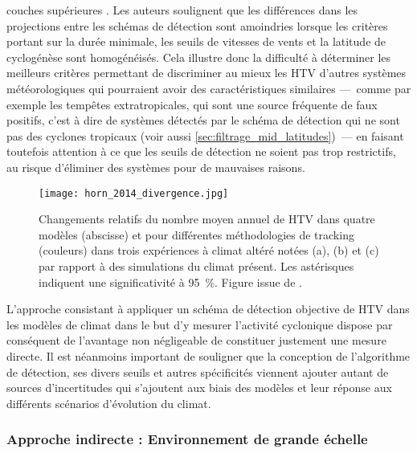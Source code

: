 \documentclass[../main.tex]{subfiles}
\begin{document}
couches supérieures \parencite{horn_tracking_2014}. Les auteurs soulignent que les différences dans les projections entre les schémas de détection sont
amoindries lorsque les critères portant sur la durée minimale, les seuils de vitesses de vents et la latitude de cyclogénèse sont homogénéisés. Cela illustre
donc la difficulté à déterminer les meilleurs critères permettant de discriminer au mieux les HTV d'autres systèmes météorologiques qui pourraient avoir des
caractéristiques similaires ---~comme par exemple les tempêtes extratropicales, qui sont une source fréquente de faux positifs, c'est à dire de systèmes
détectés par le schéma de détection qui ne sont pas des cyclones tropicaux (voir aussi \cref{sec:filtrage_mid_latitudes})~--- en faisant toutefois attention à
ce que les seuils de détection ne soient pas trop restrictifs, au risque d'éliminer des systèmes pour de mauvaises raisons.

\begin{figure}[tb]
    \centering
    \texttt{[image: horn\_2014\_divergence.jpg]}
    \caption{Changements relatifs du nombre moyen annuel de HTV dans quatre modèles (abscisse) et pour différentes méthodologies de tracking (couleurs) dans
    trois expériences à climat altéré notées (a), (b) et (c) par rapport à des simulations du climat présent. Les astérisques indiquent une significativité à
    \SI{95}{\percent}. Figure issue de \textcite{horn_tracking_2014}.}
    \label{fig:horn_2014_projections}
\end{figure}

L'approche consistant à appliquer un schéma de détection objective de HTV dans les modèles de climat dans le but d'y mesurer l'activité cyclonique dispose par
conséquent de l'avantage non négligeable de constituer justement une mesure directe. Il est néanmoins important de souligner que la conception de l'algorithme
de détection, ses divers seuils et autres spécificités viennent ajouter autant de sources d'incertitudes qui s'ajoutent aux biais des modèles et leur réponse
aux différents scénarios d'évolution du climat.

\subsubsection{Approche indirecte : Environnement de grande échelle}\label{sec:intro_indices}
\end{document}
